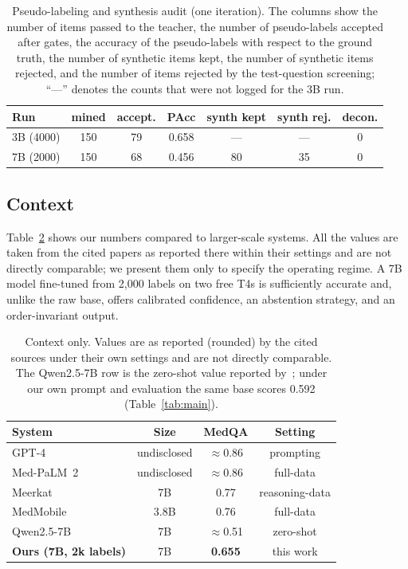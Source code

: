 \documentclass[conference]{IEEEtran}
\begin{document}
\begin{table}[tb]
\caption{Pseudo-labeling and synthesis audit (one iteration). The columns show the number of items passed to the teacher, the number of pseudo-labels accepted after gates, the accuracy of the pseudo-labels with respect to the ground truth, the number of synthetic items kept, the number of synthetic items rejected, and the number of items rejected by the test-question screening; ``---'' denotes the counts that were not logged for the 3B run.}\label{tab:audit}
\centering
\footnotesize
\setlength{\tabcolsep}{3pt}
\begin{tabular}{@{}lcccccc@{}}
\toprule
Run & mined & accept. & PAcc & synth kept & synth rej. & decon. \\
\midrule
3B (4000) & 150 & 79 & 0.658 & --- & --- & 0 \\
7B (2000) & 150 & 68 & 0.456 & 80 & 35 & 0 \\
\bottomrule
\end{tabular}
\end{table}

\subsection{Context}
Table~\ref{tab:context} shows our numbers compared to larger-scale systems. All the values are taken from the cited papers as reported there within their settings and are not directly comparable; we present them only to specify the operating regime. A 7B model fine-tuned from 2{,}000 labels on two free T4s is sufficiently accurate and, unlike the raw base, offers calibrated confidence, an abstention strategy, and an order-invariant output.

\begin{table}[tb]
\caption{Context only. Values are as reported (rounded) by the cited sources under their own settings and are not directly comparable. The Qwen2.5-7B row is the zero-shot value reported by~\cite{qwen}; under our own prompt and evaluation the same base scores 0.592 (Table~\ref{tab:main}).}\label{tab:context}
\centering
\small
\setlength{\tabcolsep}{3pt}
\begin{tabular}{@{}lccc@{}}
\toprule
System & Size & MedQA & Setting \\
\midrule
GPT-4~\cite{gpt4med} & undisclosed & $\approx$0.86 & prompting \\
Med-PaLM~2~\cite{medpalm} & undisclosed & $\approx$0.86 & full-data \\
Meerkat~\cite{meerkat} & 7B & 0.77 & reasoning-data \\
MedMobile~\cite{medmobile} & 3.8B & 0.76 & full-data \\
Qwen2.5-7B~\cite{qwen} & 7B & $\approx$0.51 & zero-shot \\
\textbf{Ours (7B, 2k labels)} & 7B & \textbf{0.655} & this work \\
\bottomrule
\end{tabular}
\end{table}
\end{document}
